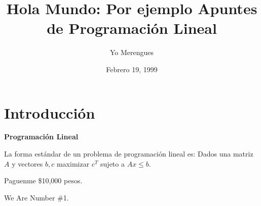 \documentclass{article}
\title{Hola Mundo: Por ejemplo Apuntes de Programación Lineal}
\author{Yo Merengues}
\date{Febrero 19, 1999}
\begin{document}
\maketitle
\section{Introducción}
\textbf{Programación Lineal}

La forma estándar de un problema de programación lineal es: Dados una
matriz $A$ y vectores $b,c$ maximizar $c^T$ sujeto a $Ax\leq b$.

Paguenme \$10,000 pesos.

We Are Number \#1.
\end{document}
